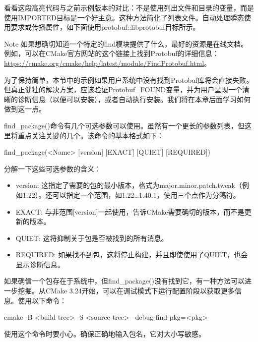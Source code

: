 看看这段高亮代码与之前示例版本的对比：不是使用列出文件和目录的变量，而是使用IMPORTED目标是一个好主意。这种方法简化了列表文件。自动处理瞬态使用要求或传播属性，如下面使用protobuf::libprotobuf目标所示。

\begin{myNotic}{Note}
如果想确切知道一个特定的find模块提供了什么，最好的资源是在线文档。例如，可以在CMake官方网站的这个链接上找到Protobuf的详细信息：\url{https://cmake.org/cmake/help/latest/module/FindProtobuf.html}。
\end{myNotic}

为了保持简单，本节中的示例如果用户系统中没有找到Protobuf库将会直接失败。但真正健壮的解决方案，应该验证Protobuf\_FOUND变量，并为用户呈现一个清晰的诊断信息（以便可以安装），或者自动执行安装。我们将在本章后面学习如何做到这一点。

find\_package()命令有几个可选参数可以使用。虽然有一个更长的参数列表，但这里将重点关注关键的几个。该命令的基本格式如下：

\begin{shell}
find_package(<Name> [version] [EXACT] [QUIET] [REQUIRED])
\end{shell}

分解一下这些可选参数的含义：

\begin{itemize}
\item
version: 这指定了需要的包的最小版本，格式为major.minor.patch.tweak（例如1.22）。还可以指定一个范围，如1.22…1.40.1，使用三个点作为分隔符。

\item
EXACT: 与非范围[version]一起使用，告诉CMake需要确切的版本，而不是更新的版本。

\item
QUIET: 这将抑制关于包是否被找到的所有消息。

\item
REQUIRED: 如果找不到包，这将停止构建，并且即使使用了QUIET，也会显示诊断信息。
\end{itemize}

如果确信一个包存在于系统中，但find\_package()没有找到它，有一种方法可以进一步挖掘。从CMake 3.24开始，可以在调试模式下运行配置阶段以获取更多信息。使用以下命令：

\begin{shell}
cmake -B <build tree> -S <source tree> --debug-find-pkg=<pkg>
\end{shell}

使用这个命令时要小心。确保正确地输入包名，它对大小写敏感。


